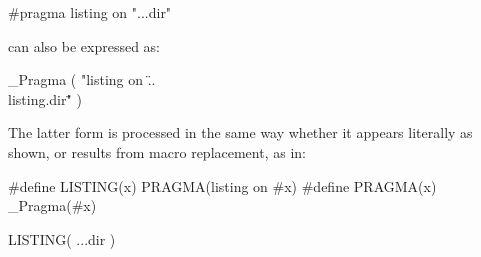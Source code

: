 \begin{example}

\begin{codeblock}
#pragma listing on "..\listing.dir"
\end{codeblock}

can also be expressed as:

\begin{codeblock}
_Pragma ( "listing on \"..\\listing.dir\"" )
\end{codeblock}

The latter form is processed in the same way whether it appears literally
as shown, or results from macro replacement, as in:

\begin{codeblock}
#define LISTING(x) PRAGMA(listing on #x)
#define PRAGMA(x) _Pragma(#x)

LISTING( ..\listing.dir )
\end{codeblock}

\end{example}%

